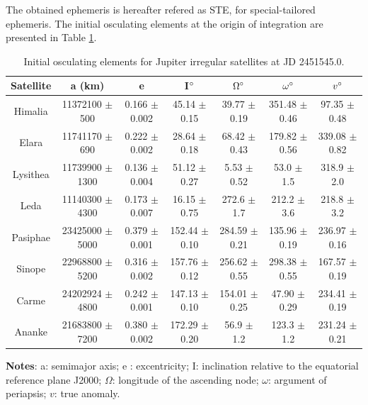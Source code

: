 \documentclass[useAMS,usenatbib]{mn2e}
\begin{document}
The obtained ephemeris is hereafter refered as STE, for special-tailored ephemeris. The initial osculating elements at the origin of integration are presented in Table \ref{Tab: sat_ell}.

\begin{table}
\caption{Initial osculating elements for Jupiter irregular satellites at JD 2451545.0.
 }\label{Tab: sat_ell}
\begin{center}
\begin{tabular}{ccccccc}
\hline\hline
Satellite & a (km) & e & I$\hbox{$^\circ$}$ & $\Omega\hbox{$^\circ$}$ & $\omega\hbox{$^\circ$}$ & $v\hbox{$^\circ$}$ \\ 
\hline
Himalia &   11372100 $\pm$ 500    &    0.166 $\pm$ 0.002      &   45.14 $\pm$ 0.15      &   39.77 $\pm$ 0.19      &   351.48 $\pm$ 0.46      &   97.35 $\pm$ 0.48    \\
Elara &   11741170 $\pm$ 690  &      0.222 $\pm$ 0.002      &   28.64 $\pm$ 0.18      &   68.42 $\pm$ 0.43      &   179.82 $\pm$ 0.56      &   339.08 $\pm$ 0.82  \\
Lysithea &   11739900 $\pm$ 1300  &      0.136 $\pm$ 0.004      &    51.12 $\pm$ 0.27     &   5.53 $\pm$ 0.52      &   53.0 $\pm$ 1.5      &   318.9 $\pm$ 2.0   \\
Leda &   11140300  $\pm$ 4300  &     0.173  $\pm$ 0.007     &   16.15  $\pm$ 0.75    &   272.6  $\pm$ 1.7    &   212.2  $\pm$ 3.6          &   218.8  $\pm$ 3.2  \\
Pasiphae &  23425000  $\pm$ 5000    &     0.379  $\pm$ 0.001       &   152.44 $\pm$ 0.10      &   284.59 $\pm$ 0.21      &   135.96 $\pm$ 0.19      &   236.97 $\pm$ 0.16 \\
Sinope &   22968800 $\pm$ 5200   &     0.316 $\pm$ 0.002      &   157.76 $\pm$ 0.12      &   256.62 $\pm$ 0.55      &   298.38 $\pm$ 0.55      &   167.57 $\pm$ 0.19    \\
Carme &   24202924 $\pm$ 4800      &  0.242 $\pm$ 0.001      &   147.13 $\pm$ 0.10      &   154.01 $\pm$ 0.25      &   47.90 $\pm$ 0.29      &   234.41 $\pm$ 0.19  \\
Ananke &  21683800  $\pm$ 7200  &     0.380 $\pm$ 0.002      &   172.29 $\pm$ 0.20      &   56.9 $\pm$ 1.2      &   123.3 $\pm$ 1.2      &   231.24 $\pm$ 0.21  \\
\hline
\end{tabular} 
\end{center}
\begin{flushleft}
\textbf{Notes}: a: semimajor axis; e : excentricity; I: inclination relative to the equatorial reference plane J2000; $\Omega$: longitude of the ascending node; $\omega$: argument of periapsis; $v$: true anomaly.
\end{flushleft}
\end{table}
\end{document}
